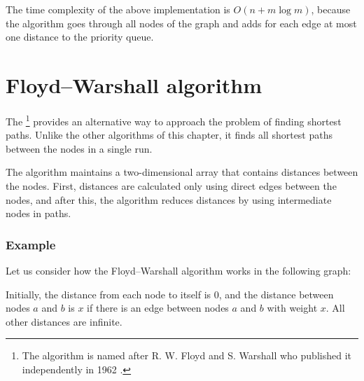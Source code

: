 The time complexity of the above implementation is
$O(n+m \log m)$, because the algorithm goes through
all nodes of the graph and adds for each edge
at most one distance to the priority queue.

\section{Floyd–Warshall algorithm}


The \footnote{The algorithm
is named after R. W. Floyd and S. Warshall
who published it independently in 1962 \cite{flo62,war62}.}
provides an alternative way to approach the problem
of finding shortest paths.
Unlike the other algorithms of this chapter,
it finds all shortest paths between the nodes
in a single run.

The algorithm maintains a two-dimensional array
that contains distances between the nodes.
First, distances are calculated only using
direct edges between the nodes,
and after this, the algorithm reduces distances
by using intermediate nodes in paths.

\subsubsection{Example}

Let us consider how the Floyd–Warshall algorithm
works in the following graph:

\begin{center}
\end{center}

Initially, the distance from each node to itself is $0$,
and the distance between nodes $a$ and $b$ is $x$
if there is an edge between nodes $a$ and $b$ with weight $x$.
All other distances are infinite.


